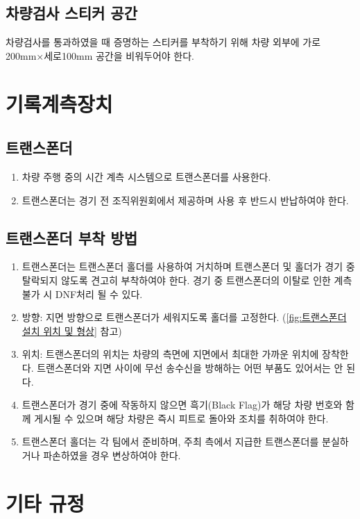 \documentclass[final,a4paper,10pt]{report}
\begin{document}
\section{차량검사 스티커 공간}
차량검사를 통과하였을 때 증명하는 스티커를 부착하기 위해 차량 외부에 가로 200mm×세로100mm 공간을 비워두어야 한다.

\chapter{기록계측장치}

\section{트랜스폰더}
\begin{enumerate}
  \item 차량 주행 중의 시간 계측 시스템으로 트랜스폰더를 사용한다.
  \item 트랜스폰더는 경기 전 조직위원회에서 제공하며 사용 후 반드시 반납하여야 한다.
\end{enumerate}

\section{트랜스폰더 부착 방법}
\begin{enumerate}
  \item 트랜스폰더는 트랜스폰더 홀더를 사용하여 거치하며 트랜스폰더 및 홀더가 경기 중 탈락되지 않도록 견고히 부착하여야 한다. 경기 중 트랜스폰더의 이탈로 인한 계측 불가 시 DNF처리 될 수 있다.
  \item 방향: 지면 방향으로 트랜스폰더가 세워지도록 홀더를 고정한다. (\cref{fig:트랜스폰더 설치 위치 및 형상} 참고)
  \item 위치: 트랜스폰더의 위치는 차량의 측면에 지면에서 최대한 가까운 위치에 장착한다. 트랜스폰더와 지면 사이에 무선 송수신을 방해하는 어떤 부품도 있어서는 안 된다.
  \item 트랜스폰더가 경기 중에 작동하지 않으면 흑기(Black Flag)가 해당 차량 번호와 함께 게시될 수 있으며 해당 차량은 즉시 피트로 돌아와 조치를 취하여야 한다.
  \item 트랜스폰더 홀더는 각 팀에서 준비하며, 주최 측에서 지급한 트랜스폰더를 분실하거나 파손하였을 경우 변상하여야 한다.
\end{enumerate}


\chapter{기타 규정}
\end{document}
